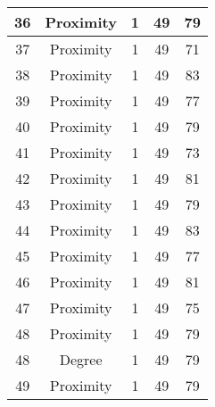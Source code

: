\documentclass[results.tex]{subfiles}
\begin{document}
\begin{center}
\begin{tabular}{| c || c | c | c | c |}
            \hline
            36                      & Proximity                    & 1                      & 49                      & 79                   \\
            \hline
            37                      & Proximity                    & 1                      & 49                      & 71                   \\
            \hline
            38                      & Proximity                    & 1                      & 49                      & 83                   \\
            \hline
            39                      & Proximity                    & 1                      & 49                      & 77                   \\
            \hline
            40                      & Proximity                    & 1                      & 49                      & 79                   \\
            \hline
            41                      & Proximity                    & 1                      & 49                      & 73                   \\
            \hline
            42                      & Proximity                    & 1                      & 49                      & 81                   \\
            \hline
            43                      & Proximity                    & 1                      & 49                      & 79                   \\
            \hline
            44                      & Proximity                    & 1                      & 49                      & 83                   \\
            \hline
            45                      & Proximity                    & 1                      & 49                      & 77                   \\
            \hline
            46                      & Proximity                    & 1                      & 49                      & 81                   \\
            \hline
            47                      & Proximity                    & 1                      & 49                      & 75                   \\
            \hline
            48                      & Proximity                    & 1                      & 49                      & 79                   \\
            \hline
            48                      & Degree                       & 1                      & 49                      & 79                   \\
            \hline
            49                      & Proximity                    & 1                      & 49                      & 79                   \\
            \hline
        \end{tabular}
    \end{center}
\end{document}
